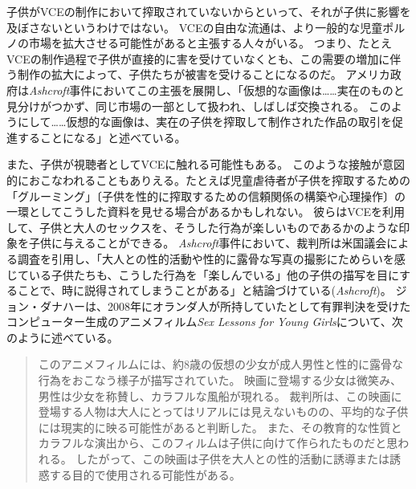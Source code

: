\documentclass[paper=a4,book,openany]{jlreq}
\begin{document}
子供がVCEの制作において搾取されていないからといって、それが子供に影響を及ぼさないというわけではない。
VCEの自由な流通は、より一般的な児童ポルノの市場を拡大させる可能性があると主張する人々がいる。
つまり、たとえVCEの制作過程で子供が直接的に害を受けていなくとも、この需要の増加に伴う制作の拡大によって、子供たちが被害を受けることになるのだ。
アメリカ政府は\emph{Ashcroft}事件においてこの主張を展開し、「仮想的な画像は……実在のものと見分けがつかず、同じ市場の一部として扱われ、しばしば交換される。
このようにして……仮想的な画像は、実在の子供を搾取して制作された作品の取引を促進することになる」と述べている。

また、子供が視聴者としてVCEに触れる可能性もある。
このような接触が意図的におこなわれることもありえる。たとえば児童虐待者が子供を搾取するための「グルーミング」〔子供を性的に搾取するための信頼関係の構築や心理操作〕の一環としてこうした資料を見せる場合があるかもしれない。
彼らはVCEを利用して、子供と大人のセックスを、そうした行為が楽しいものであるかのような印象を子供に与えることができる。
\emph{Ashcroft}事件において、裁判所は米国議会による調査を引用し、「大人との性的活動や性的に露骨な写真の撮影にためらいを感じている子供たちも、こうした行為を「楽しんでいる」他の子供の描写を目にすることで、時に説得されてしまうことがある」と結論づけている(\emph{Ashcroft})。
ジョン・ダナハーは、2008年にオランダ人が所持していたとして有罪判決を受けたコンピューター生成のアニメフィルム\emph{Sex Lessons for Young Girls}について、次のように述べている。

\begin{quote}
このアニメフィルムには、約8歳の仮想の少女が成人男性と性的に露骨な行為をおこなう様子が描写されていた。
映画に登場する少女は微笑み、男性は少女を称賛し、カラフルな風船が現れる。
裁判所は、この映画に登場する人物は大人にとってはリアルには見えないものの、平均的な子供には現実的に映る可能性があると判断した。
また、その教育的な性質とカラフルな演出から、このフィルムは子供に向けて作られたものだと思われる。
したがって、この映画は子供を大人との性的活動に誘導または誘惑する目的で使用される可能性がある。\citep[pp.137--138]{strikwerda17:_legal_moral_implic_child_sex_robot}
\end{quote}
\end{document}
